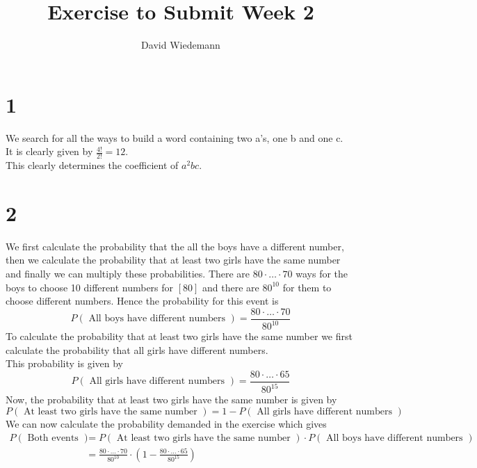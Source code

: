 \documentclass[11pt, a4paper, twoside]{article}
\begin{document}
\title{Exercise to Submit Week 2}
\author{David Wiedemann}
\maketitle
\section*{1}

We search for all the ways to build a word containing two a's, one b and one c.\\
It is clearly given by $ \frac{4!}{2!}=12 $.\\
This clearly determines the coefficient of $a^{2}bc$.
\section*{2}
We first calculate the probability that the all the boys have a different number, then we calculate the probability that at least two girls have the same number and finally we can multiply these probabilities.
There are $80\cdot \ldots \cdot 70$ ways for the boys to choose 10 different numbers for $[80]$ and there are $80^{ 10 }$ for them to choose different numbers. Hence the probability for this event is 
\[ 
	P( \text{ All boys have different numbers }   )= \frac{80\cdot \ldots \cdot 70}{80^{10}}
\]
To calculate the probability that at least two girls have the same number we first calculate the probability that all girls have different numbers.\\
This probability is given by
\[ 
	P( \text{ All girls have different numbers } ) =\frac{80 \cdot \ldots \cdot 65}{80^{15}}
\]
Now, the probability that at least two girls have the same number is given by
\[ 
	P(  \text{ At least two girls have the same number } ) = 1- P( \text{ All girls have different numbers }) 
\]
We can now calculate the probability demanded in the exercise which gives
\begin{align*}
	P( \text{ Both events } ) &=P(  \text{ At least two girls have the same number } ) \cdot P( \text{ All boys have different numbers }   ) \\
				  &= \frac{80\cdot \ldots \cdot 70}{80^{10}} \cdot \left(1-\frac{80 \cdot \ldots \cdot 65}{80^{15}} \right) 
\end{align*}







\end{document}
